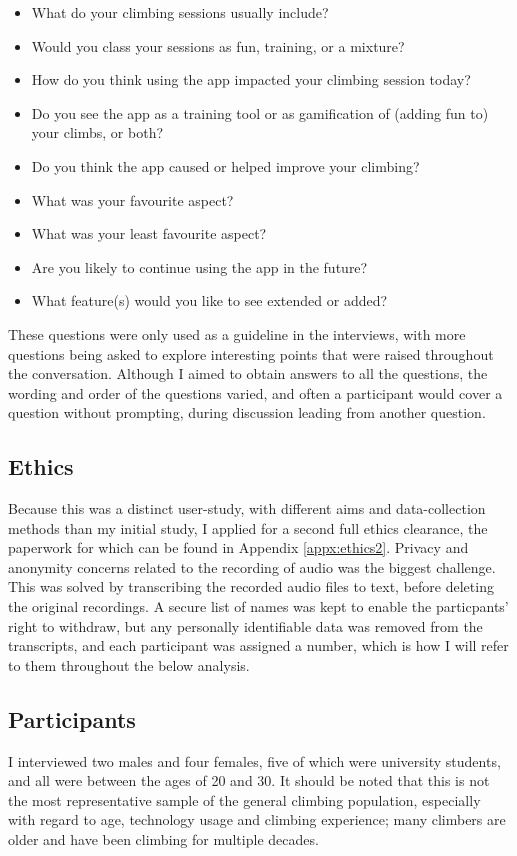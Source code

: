 \begin{itemize}
    \item What do your climbing sessions usually include?
    \item Would you class your sessions as fun, training, or a mixture?
    \item How do you think using the app impacted your climbing session today?
    \item Do you see the app as a training tool or as gamification of (adding fun to) your climbs, or both?
    \item Do you think the app caused or helped improve your climbing?
    \item What was your favourite aspect?
    \item What was your least favourite aspect?
    \item Are you likely to continue using the app in the future?
    \item What feature(s) would you like to see extended or added?
\end{itemize}

These questions were only used as a guideline in the interviews, with more questions being asked to explore interesting points that were raised  throughout the conversation.
Although I aimed to obtain answers to all the questions, the wording and order of the questions varied, and often a participant would cover a question without prompting, during discussion leading from another question.


\subsection{Ethics}
Because this was a distinct user-study, with different aims and data-collection methods than my initial study, I applied for a second full ethics clearance, the paperwork for which can be found in Appendix \ref{appx:ethics2}.
Privacy and anonymity concerns related to the recording of audio was the biggest challenge.
This was solved by transcribing the recorded audio files to text, before deleting the original recordings.
A secure list of names was kept to enable the particpants' right to withdraw, but any personally identifiable data was removed from the transcripts, and each participant was assigned a number, which is how I will refer to them throughout the below analysis.

\subsection{Participants}
I interviewed two males and four females, five of which were university students, and all were between the ages of 20 and 30.
It should be noted that this is not the most representative sample of the general climbing population, especially with regard to age, technology usage and climbing experience; many climbers are older and have been climbing for multiple decades.

